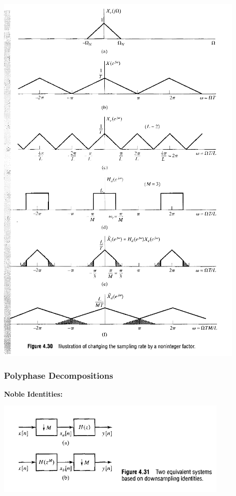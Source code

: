 \documentclass[11pt]{article}
\begin{document}
  \includegraphics[scale=0.7]{graphics/noninteger.png}

  \pagebreak

  \subsubsection{Polyphase Decompositions}

  \textbf{Noble Identities:}

  \includegraphics[scale=0.7]{graphics/compressor_noble.png}
\end{document}
